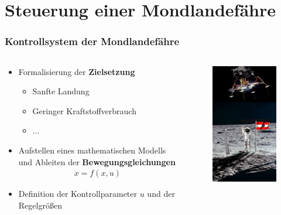 \documentclass{beamer}
\begin{document}
	\section{Steuerung einer Mondlandefähre}

	\begin{frame}
		\frametitle{Kontrollsystem der Mondlandefähre}
		\begin{columns}
			\begin{column}{0.58\textwidth}
				\begin{itemize}
					\item Formalisierung der \textbf{Zielsetzung}
						\begin{itemize}
							\item Sanfte Landung
							\item Geringer Kraftstoffverbrauch
							\item ...
						\end{itemize}
					\item Aufstellen eines mathematischen Modells und Ableiten der \textbf{Bewegungsgleichungen}
						\begin{align*}
							\dot{x} = f(x, u)
						\end{align*}
					\item Definition der Kontrollparameter $u$ und der Regelgrößen
				\end{itemize}
			\end{column}
			\begin{column}{0.48\textwidth}
				\begin{figure}
					\includegraphics[scale = 0.33]{images/austrianLanding.jpg}	
				\end{figure}
			\end{column}
		\end{columns}
	\end{frame}
		
\end{document}
